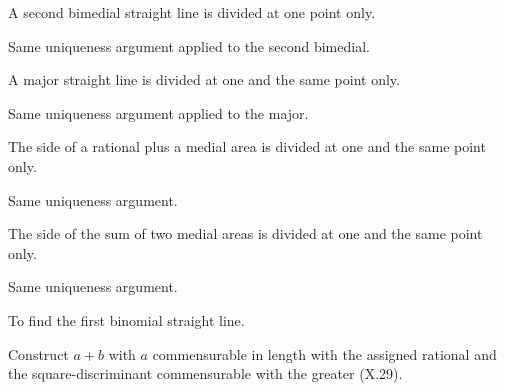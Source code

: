 \documentclass{rrxiv}
\begin{document}
\begin{claim}
\label{prop:X.44}
A second bimedial straight line is divided at one point only.
\end{claim}
\begin{evidence}[Proof of X.44]
\label{ev:X.44}
Same uniqueness argument applied to the second bimedial.
\end{evidence}

\begin{claim}
\label{prop:X.45}
A major straight line is divided at one and the same point only.
\end{claim}
\begin{evidence}[Proof of X.45]
\label{ev:X.45}
Same uniqueness argument applied to the major.
\end{evidence}

\begin{claim}
\label{prop:X.46}
The side of a rational plus a medial area is divided at one and the
same point only.
\end{claim}
\begin{evidence}[Proof of X.46]
\label{ev:X.46}
Same uniqueness argument.
\end{evidence}

\begin{claim}
\label{prop:X.47}
The side of the sum of two medial areas is divided at one and the
same point only.
\end{claim}
\begin{evidence}[Proof of X.47]
\label{ev:X.47}
Same uniqueness argument.
\end{evidence}

\begin{claim}
\label{prop:X.48}
To find the first binomial straight line.
\end{claim}
\begin{evidence}[Proof of X.48]
\label{ev:X.48}
Construct $a + b$ with $a$ commensurable in length with the
assigned rational and the square-discriminant commensurable with the
greater (X.29).
\end{evidence}
\end{document}
